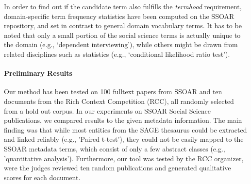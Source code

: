 In order to find out if the candidate term also fulfills the \textit{termhood} requirement, domain-specific term frequency statistics have been computed on the SSOAR repository, and set in contrast to general domain vocabulary terms. 
It has to be noted that only a small portion of the social science terms is actually unique to the domain (e.g., `dependent interviewing'), while others might be drawn from related disciplines such as statistics (e.g., `conditional likelihood ratio test').


\paragraph{Preliminary Results}%
Our method has been tested on 100 fulltext papers from SSOAR and ten documents from the Rich Context Competition (RCC), all randomly selected from a hold out corpus.
In our experiments on SSOAR Social Science publications, we compared results to the given metadata information.
The main finding was that while most entities from the SAGE thesaurus could be extracted and linked reliably (e.g., 'Paired t-test'), they could not be easily mapped to the SSOAR metadata terms, which consist of only a few abstract classes (e.g., 'quantitative analysis'). Furthermore, our tool was tested by the RCC organizer, were the judges reviewed ten random publications and generated qualitative scores for each document. %

